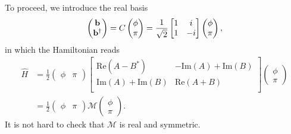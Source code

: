 To proceed, we introduce the real basis 
\begin{equation}\begin{aligned}
\label{eq:real_basis}
\begin{pmatrix}
{\bf b}\\
{\bf b}^\dagger
\end{pmatrix}
=C\begin{pmatrix}
\phi\\
\pi
\end{pmatrix}
=\frac{1}{\sqrt{2}}\begin{bmatrix}
1 & i \\
1 & -i
\end{bmatrix}\begin{pmatrix}
\phi\\
\pi
\end{pmatrix},
\end{aligned}\end{equation}
in which the Hamiltonian reads
\begin{equation}\begin{aligned}
\hat{H}
&=\frac{1}{2}
\begin{pmatrix}
\phi & \pi
\end{pmatrix}
\begin{bmatrix}
\text{Re}(A-B^*) & -\text{Im}(A)+\text{Im}(B)\\
\text{Im}(A)+\text{Im}(B)& \text{Re}(A+B) \\
\end{bmatrix}
\begin{pmatrix}
\phi\\
\pi
\end{pmatrix} \\
&=\frac{1}{2}
\begin{pmatrix}
\phi & \pi
\end{pmatrix}
\mathcal{M}
\begin{pmatrix}
\phi\\
\pi
\end{pmatrix}.
\end{aligned}\end{equation}
It is not hard to check that $\mathcal{M}$ is real and symmetric. 

